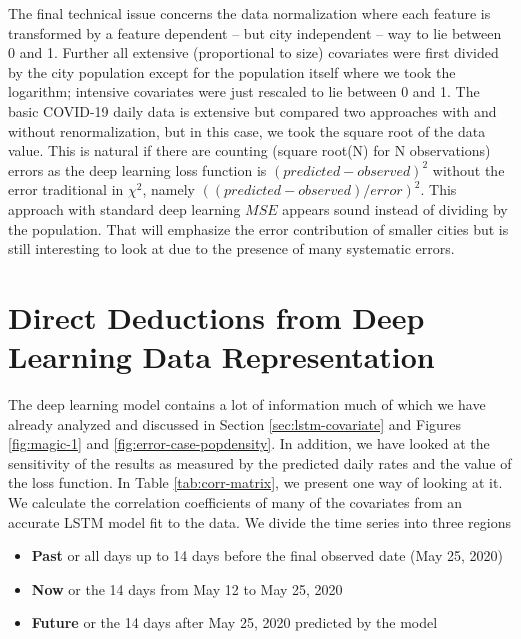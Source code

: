 \documentclass[12pt]{article}
\theoremstyle{definition}
\renewcommand{\_}{%
    \textunderscore\hspace{0pt}%
}
\begin{document}
The final technical issue concerns the data normalization where each
feature is transformed by a feature dependent -- but city independent -- way
to lie between 0 and 1. Further all extensive (proportional to size)
covariates were first divided by the city population except for
the population itself where we took the logarithm; intensive covariates
were just rescaled to lie between 0 and 1. The basic COVID-19 daily
data is extensive but compared two approaches with and without
renormalization, but in this case, we took the square root of the data value.
This is natural if there are counting (square root(N) for N
observations) errors as the deep learning loss function is
$(predicted-observed)^{2}$ without the error traditional in
$\chi^{2}$, namely $((predicted-observed)/error)^{2}$. This approach
with standard deep learning $MSE$ appears sound instead of dividing by
the population. That will emphasize the error contribution of
smaller cities but is still interesting to look at due to the presence of many systematic errors.


\section{Direct Deductions from Deep Learning Data Representation}

The deep learning model contains a lot of information much of which we have already analyzed and discussed in Section
\ref{sec:lstm-covariate} and Figures \ref{fig:magic-1} and
\ref{fig:error-case-popdensity}. In addition, we have looked at the
sensitivity of the results as measured by the predicted daily rates
and the value of the loss function. In Table \ref{tab:corr-matrix}, we
present one way of looking at it. We calculate the correlation
coefficients of many of the covariates from an accurate LSTM model fit
to the data. We divide the time series into three regions

\begin{itemize}
\item \textbf{Past} or all days up to 14 days before the final observed date (May 25, 2020)
\item \textbf{Now} or the 14 days from May 12 to May 25, 2020
\item \textbf{Future} or the 14 days after May 25, 2020 predicted by the model
\end{itemize}
 
\end{document}
